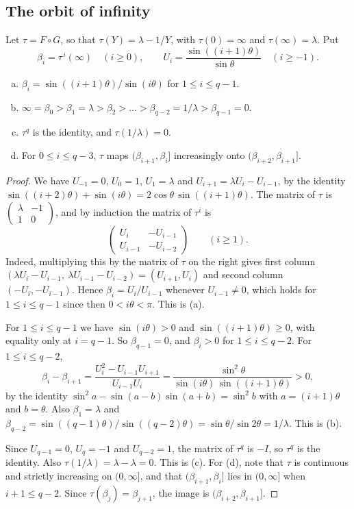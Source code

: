 \subsection{The orbit of infinity}

Let $\tau=F\circ G$, so that $\tau(Y)=\lambda-1/Y$, with $\tau(0)=\infty$ and $\tau(\infty)=\lambda$.
Put
\[
\beta_i=\tau^{\,i}(\infty)\quad(i\ge0),\qquad U_i=\frac{\sin((i+1)\theta)}{\sin\theta}\quad(i\ge-1).
\]

\begin{lemma}\label{lem:orbit}
\begin{enumerate}[(a)]
\item $\beta_i=\sin((i+1)\theta)/\sin(i\theta)$ for $1\le i\le q-1$.
\item $\infty=\beta_0>\beta_1=\lambda>\beta_2>\dots>\beta_{q-2}=1/\lambda>\beta_{q-1}=0$.
\item $\tau^q$ is the identity, and $\tau(1/\lambda)=0$.
\item For $0\le i\le q-3$, $\tau$ maps $(\beta_{i+1},\beta_i]$ increasingly onto
$(\beta_{i+2},\beta_{i+1}]$.
\end{enumerate}
\end{lemma}

\begin{proof}
We have $U_{-1}=0$, $U_0=1$, $U_1=\lambda$ and $U_{i+1}=\lambda U_i-U_{i-1}$, by the identity
$\sin((i+2)\theta)+\sin(i\theta)=2\cos\theta\,\sin((i+1)\theta)$. The matrix of $\tau$ is
$\left(\begin{smallmatrix}\lambda&-1\\1&0\end{smallmatrix}\right)$, and by induction the matrix of
$\tau^i$ is
\[
\begin{pmatrix}U_i&-U_{i-1}\\U_{i-1}&-U_{i-2}\end{pmatrix}\qquad(i\ge1).
\]
Indeed, multiplying this by the matrix of $\tau$ on the right gives first column
$(\lambda U_i-U_{i-1},\ \lambda U_{i-1}-U_{i-2})=(U_{i+1},U_i)$ and second column $(-U_i,-U_{i-1})$.
Hence $\beta_i=U_i/U_{i-1}$ whenever $U_{i-1}\neq0$, which holds for $1\le i\le q-1$ since then
$0<i\theta<\pi$. This is (a).

For $1\le i\le q-1$ we have $\sin(i\theta)>0$ and $\sin((i+1)\theta)\ge0$, with equality only at
$i=q-1$. So $\beta_{q-1}=0$, and $\beta_i>0$ for $1\le i\le q-2$. For $1\le i\le q-2$,
\[
\beta_i-\beta_{i+1}=\frac{U_i^2-U_{i-1}U_{i+1}}{U_{i-1}U_i}=\frac{\sin^2\theta}{\sin(i\theta)\,\sin((i+1)\theta)}>0,
\]
by the identity $\sin^2a-\sin(a-b)\sin(a+b)=\sin^2b$ with $a=(i+1)\theta$ and $b=\theta$. Also
$\beta_1=\lambda$ and $\beta_{q-2}=\sin((q-1)\theta)/\sin((q-2)\theta)=\sin\theta/\sin2\theta=1/\lambda$.
This is (b).

Since $U_{q-1}=0$, $U_q=-1$ and $U_{q-2}=1$, the matrix of $\tau^q$ is $-I$, so $\tau^q$ is the
identity. Also $\tau(1/\lambda)=\lambda-\lambda=0$. This is (c). For (d), note that $\tau$ is continuous
and strictly increasing on $(0,\infty]$, and that $(\beta_{i+1},\beta_i]$ lies in $(0,\infty]$ when
$i+1\le q-2$. Since $\tau(\beta_j)=\beta_{j+1}$, the image is $(\beta_{i+2},\beta_{i+1}]$.
\end{proof}

